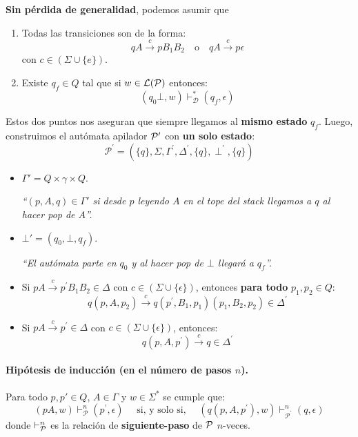 \textbf{Sin pérdida de generalidad}, podemos asumir que
\begin{enumerate}
    \item Todas las transiciones son de la forma:
          $$
              q A \stackrel{c}{\rightarrow} p B_1 B_2 \quad \text{o} \quad q A \stackrel{c}{\rightarrow} p \epsilon
          $$
          con $c \in (\Sigma \cup \{e\})$.
    \item Existe $q_f \in Q$ tal que si $w \in \mathcal{L}(\mathcal{P})$ entonces:
          $$
              \left(q_0 \bot, w\right) \vdash_{\mathcal{D}}^*\left(q_f, \epsilon\right)
          $$
\end{enumerate}
Estos dos puntos nos aseguran  que siempre llegamos al \textbf{mismo estado} $q_f$. Luego, construimos el autómata apilador $\mathcal{P}'$ con \textbf{un solo estado}:
$$
    \mathcal{P}^{\prime}=\left(\{q\}, \Sigma, \Gamma^{\prime}, \Delta^{\prime},\{q\}, \perp^{\prime},\{q\}\right)
$$
\begin{itemize}
    \item $\Gamma'= Q\times \gamma \times Q$.

          \textit{``$(p, A, q) \in \Gamma'$ si desde $p$ leyendo $A$ en el tope del stack llegamos a $q$ al hacer pop de $A$''.}

    \item $\bot' = (q_0,\bot, q_f)$.

          \textit{``El autómata parte en $q_0$ y al hacer pop de $\bot$ llegará a $q_f$''.}

    \item Si $p A \stackrel{c}{\rightarrow} p^{\prime} B_1 B_2 \in \Delta$ con $c \in (\Sigma \cup \{\epsilon\})$, entonces \textbf{para todo} $p_1,p_2 \in Q$:
          $$
              q\left(p, A, p_2\right) \stackrel{c}{\rightarrow} q\left(p^{\prime}, B_1, p_1\right)\left(p_1, B_2, p_2\right) \in \Delta^{\prime}
          $$

    \item Si $p A \stackrel{c}{\rightarrow} p^{\prime}\in \Delta$ con $c \in (\Sigma \cup \{\epsilon\})$, entonces:
          $$
              q\left(p, A, p^{\prime}\right) \stackrel{c}{\rightarrow} q \in \Delta^{\prime}
          $$
\end{itemize}

\paragraph{Hipótesis de inducción (en el número de pasos $n$).} Para todo $p,p' \in Q$, $A \in \Gamma$ y $w \in \Sigma^*$ se cumple que:
$$
    (p A, w) \vdash_{\mathcal{P}}^n\left(p^{\prime}, \epsilon\right) \quad \text { si, y solo si, } \quad\left(q\left(p, A, p^{\prime}\right), w\right) \vdash_{\mathcal{P}^{\prime}}^n(q, \epsilon)
$$
donde $\vdash_{\mathcal{P}}^n$ es la relación de \textbf{siguiente-paso} de $\mathcal{P}$ $n$-veces. \medbreak

